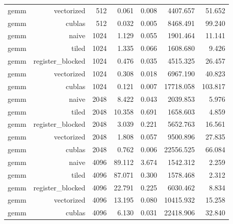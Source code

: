 \begin{longtable}{lrrrrrr}
gemm & vectorized & 512 & 0.061 & 0.008 & 4407.657 & 51.652 \\
gemm & cublas & 512 & 0.032 & 0.005 & 8468.491 & 99.240 \\
gemm & naive & 1024 & 1.129 & 0.055 & 1901.464 & 11.141 \\
gemm & tiled & 1024 & 1.335 & 0.066 & 1608.680 & 9.426 \\
gemm & register\_blocked & 1024 & 0.476 & 0.035 & 4515.325 & 26.457 \\
gemm & vectorized & 1024 & 0.308 & 0.018 & 6967.190 & 40.823 \\
gemm & cublas & 1024 & 0.121 & 0.007 & 17718.058 & 103.817 \\
gemm & naive & 2048 & 8.422 & 0.043 & 2039.853 & 5.976 \\
gemm & tiled & 2048 & 10.358 & 0.691 & 1658.603 & 4.859 \\
gemm & register\_blocked & 2048 & 3.039 & 0.221 & 5652.763 & 16.561 \\
gemm & vectorized & 2048 & 1.808 & 0.057 & 9500.896 & 27.835 \\
gemm & cublas & 2048 & 0.762 & 0.006 & 22556.525 & 66.084 \\
gemm & naive & 4096 & 89.112 & 3.674 & 1542.312 & 2.259 \\
gemm & tiled & 4096 & 87.071 & 0.300 & 1578.468 & 2.312 \\
gemm & register\_blocked & 4096 & 22.791 & 0.225 & 6030.462 & 8.834 \\
gemm & vectorized & 4096 & 13.195 & 0.080 & 10415.932 & 15.258 \\
gemm & cublas & 4096 & 6.130 & 0.031 & 22418.906 & 32.840 \\
\end{longtable}
